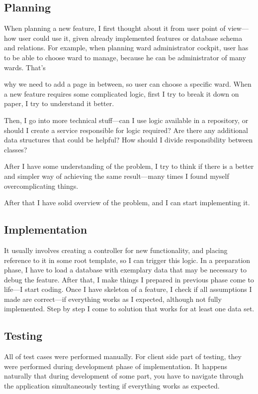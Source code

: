 \documentclass[a4paper,twoside,12pt]{book}
\newcommand{\ksremark}[1]{%
{%
{\color{brickred}{[\foreignlanguage{polish}{#1}]}}}%
\addcontentsline{rks}{uwagas}{\protect{\foreignlanguage{polish}{#1}}}%
}
\begin{document}
      \subsection{Planning}
        When planning a new feature, I first thought about it from user point of view---how user could use it, given already implemented features or database schema and relations.
        For example, when planning ward administrator cockpit, user has to be able to choose ward to manage, because he can be administrator of many wards.
        That's \ksremark{That is} why we need to add a page in between, so user can choose a specific ward.
        When a new feature requires some complicated logic, first I try to break it down on paper, I try to understand it better.

        Then, I go into more technical stuff---can I use logic available in a repository, or should I create a service responsible for logic required?
        Are there any additional data structures that could be helpful?
        How should I divide responsibility between classes?

        After I have some understanding of the problem, I try to think if there is a better and simpler way of achieving the same result---many times I found myself overcomplicating things.

        After that I have solid overview of the problem, and I can start implementing it.

      \subsection{Implementation}
        It usually involves creating a controller for new functionality, and placing reference to it in some root template, so I can trigger this logic.
        In a preparation phase, I have to load a database with exemplary data that may be necessary to debug the feature.
        After that, I make things I prepared in previous phase come to life---I start coding.
        Once I have skeleton of a feature, I check if all assumptions I made are correct---if everything works as I expected, although not fully implemented.
        Step by step I come to solution that works for at least one data set.
        
      \subsection{Testing}
        All of test cases were performed manually.
        For client side part of testing, they were performed during development phase of implementation.
        It happens naturally that during development of some part, you have to navigate through the application simultaneously testing if everything works as expected.
\end{document}
